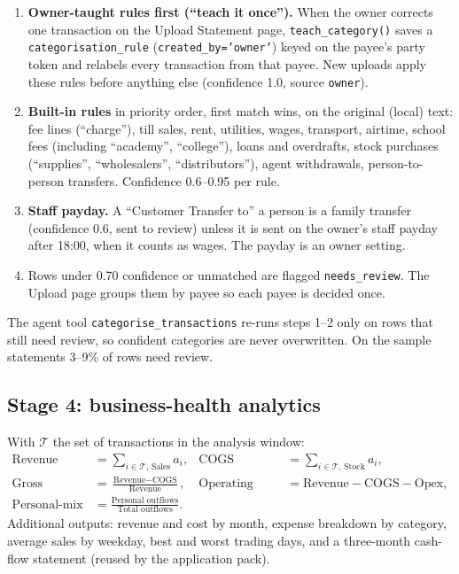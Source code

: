 \documentclass[10pt,a4paper]{article}
\newcommand{\code}[1]{\texttt{\small #1}}
\begin{document}
\begin{enumerate}
  \item \textbf{Owner-taught rules first (``teach it once'').} When the owner corrects one transaction on the Upload Statement page, \code{teach\_category()} saves a \code{categorisation\_rule} (\code{created\_by='owner'}) keyed on the payee's party token and relabels every transaction from that payee. New uploads apply these rules before anything else (confidence 1.0, source \code{owner}).
  \item \textbf{Built-in rules} in priority order, first match wins, on the original (local) text: fee lines (``charge''), till sales, rent, utilities, wages, transport, airtime, school fees (including ``academy'', ``college''), loans and overdrafts, stock purchases (``supplies'', ``wholesalers'', ``distributors''), agent withdrawals, person-to-person transfers. Confidence 0.6--0.95 per rule.
  \item \textbf{Staff payday.} A ``Customer Transfer to'' a person is a family transfer (confidence 0.6, sent to review) unless it is sent on the owner's staff payday after 18:00, when it counts as wages. The payday is an owner setting.
  \item Rows under 0.70 confidence or unmatched are flagged \code{needs\_review}. The Upload page groups them by payee so each payee is decided once.
\end{enumerate}
The agent tool \code{categorise\_transactions} re-runs steps 1--2 only on rows that still need review, so confident categories are never overwritten. On the sample statements 3--9\% of rows need review.

\subsection{Stage 4: business-health analytics}
With $\mathcal{T}$ the set of transactions in the analysis window:
\begin{align*}
\text{Revenue} &= \sum_{i\in\mathcal{T},\,\text{Sales}} a_i, &
\text{COGS} &= \sum_{i\in\mathcal{T},\,\text{Stock}} a_i,\\
\text{Gross margin} &= \frac{\text{Revenue}-\text{COGS}}{\text{Revenue}}, &
\text{Operating cash flow} &= \text{Revenue}-\text{COGS}-\text{Opex},\\
\text{Personal-mix ratio} &= \frac{\text{Personal outflows}}{\text{Total outflows}}.
\end{align*}
Additional outputs: revenue and cost by month, expense breakdown by category, average sales by weekday, best and worst trading days, and a three-month cash-flow statement (reused by the application pack).
\end{document}
